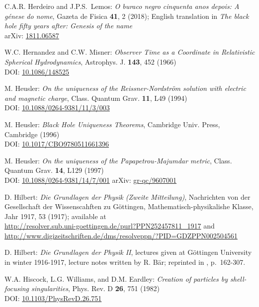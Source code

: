 \begin{thebibliography}{123}
C.A.R. Herdeiro and J.P.S.~Lemos:
\emph{O buraco negro cinquenta anos depois:
A génese do nome},
Gazeta de Fisica {\bf 41}, 2 (2018); English translation in
\emph{The black hole fifty years after: Genesis of the name}\\
arXiv: \href{https://arxiv.org/abs/1811.06587}{1811.06587}

W.C. Hernandez and C.W. Misner:
{\em Observer Time as a Coordinate in Relativistic Spherical Hydrodynamics},
Astrophys. J. {\bf 143}, 452 (1966) \\
DOI: \href{https://doi.org/10.1086/148525}{10.1086/148525}

M. Heusler:
{\em On the uniqueness of the Reissner-Nordström solution with electric and magnetic charge},
Class. Quantum Grav. {\bf 11}, L49 (1994)\\
DOI: \href{https://doi.org/10.1088/0264-9381/11/3/003}{10.1088/0264-9381/11/3/003}

M. Heusler:
{\em Black Hole Uniqueness Theorems},
Cambridge Univ. Press, Cambridge (1996) \\
DOI: \href{https://doi.org/10.1017/CBO9780511661396}{10.1017/CBO9780511661396}

M. Heusler:
{\em On the uniqueness of the Papapetrou-Majumdar metric},
Class. Quantum Grav. {\bf 14}, L129 (1997)\\
DOI: \href{https://doi.org/10.1088/0264-9381/14/7/001}{10.1088/0264-9381/14/7/001}\hfill
arXiv: \href{https://arxiv.org/abs/gr-qc/9607001}{gr-qc/9607001}

D. Hilbert:
{\em Die Grundlagen der Physik (Zweite Mitteilung)},
Nachrichten von der Gesellschaft der Wissenscahften zu Göttingen,
Mathematisch-physikalishe Klasse, Jahr 1917, 53 (1917);
available at\\
\url{http://resolver.sub.uni-goettingen.de/purl?PPN252457811_1917} and\\
\url{http://www.digizeitschriften.de/dms/resolveppn/?PID=GDZPPN002504561}

D. Hilbert:
{\em Die Grundlagen der Physik II},
lectures given at Göttingen University in winter 1916-1917,
lecture notes written by R. Bär; reprinted
in \cite{SauerM09}, p.~162-307.

W.A. Hiscock, L.G. Williams, and D.M. Eardley:
{\em Creation of particles by shell-focusing singularities},
Phys. Rev. D {\bf 26}, 751 (1982)\\
DOI: \href{https://doi.org/10.1103/PhysRevD.26.751}{10.1103/PhysRevD.26.751}


\end{thebibliography}
